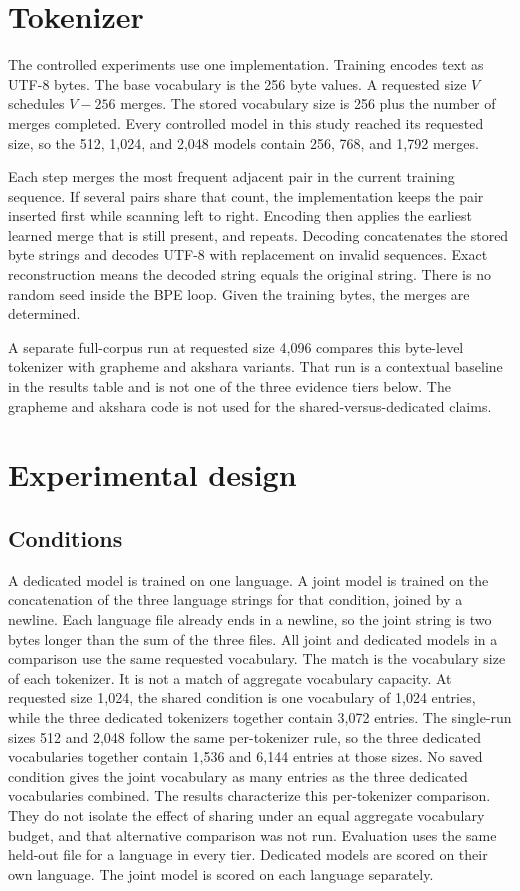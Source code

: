 \documentclass[10pt,twocolumn]{article}
\begin{document}
\section{Tokenizer}

The controlled experiments use one implementation.
Training encodes text as UTF-8 bytes.
The base vocabulary is the 256 byte values.
A requested size $V$ schedules $V-256$ merges.
The stored vocabulary size is 256 plus the number of merges completed.
Every controlled model in this study reached its requested size, so the 512, 1{,}024, and 2{,}048 models contain 256, 768, and 1{,}792 merges.

Each step merges the most frequent adjacent pair in the current training sequence.
If several pairs share that count, the implementation keeps the pair inserted first while scanning left to right.
Encoding then applies the earliest learned merge that is still present, and repeats.
Decoding concatenates the stored byte strings and decodes UTF-8 with replacement on invalid sequences.
Exact reconstruction means the decoded string equals the original string.
There is no random seed inside the BPE loop.
Given the training bytes, the merges are determined.

A separate full-corpus run at requested size 4{,}096 compares this byte-level tokenizer with grapheme and akshara variants.
That run is a contextual baseline in the results table and is not one of the three evidence tiers below.
The grapheme and akshara code is not used for the shared-versus-dedicated claims.

\section{Experimental design}

\subsection{Conditions}

A dedicated model is trained on one language.
A joint model is trained on the concatenation of the three language strings for that condition, joined by a newline.
Each language file already ends in a newline, so the joint string is two bytes longer than the sum of the three files.
All joint and dedicated models in a comparison use the same requested vocabulary.
The match is the vocabulary size of each tokenizer.
It is not a match of aggregate vocabulary capacity.
At requested size 1{,}024, the shared condition is one vocabulary of 1{,}024 entries, while the three dedicated tokenizers together contain 3{,}072 entries.
The single-run sizes 512 and 2{,}048 follow the same per-tokenizer rule, so the three dedicated vocabularies together contain 1{,}536 and 6{,}144 entries at those sizes.
No saved condition gives the joint vocabulary as many entries as the three dedicated vocabularies combined.
The results characterize this per-tokenizer comparison.
They do not isolate the effect of sharing under an equal aggregate vocabulary budget, and that alternative comparison was not run.
Evaluation uses the same held-out file for a language in every tier.
Dedicated models are scored on their own language.
The joint model is scored on each language separately.
\end{document}
